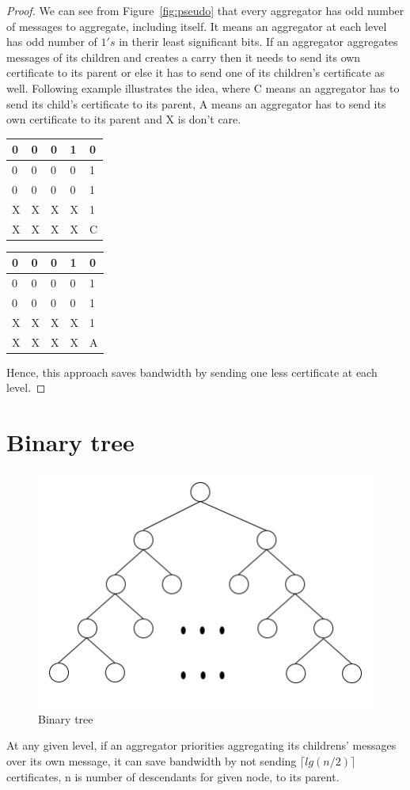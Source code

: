 	\begin{proof}
		We can see from Figure~\ref{fig:pseudo} that every aggregator has odd number of messages to aggregate, including itself.
		It means an aggregator at each level has odd number of $1's$ in therir least significant bits. 
		If an aggregator aggregates messages of its children and creates a carry then it needs to send its own certificate to its parent or else it has to send one of its children's certificate as well.
		Following example illustrates the idea, where C means an aggregator has to send its child's certificate to its parent, A means an aggregator has to send its own certificate to its parent and X is don't care.
		\begin{multicols}{2}
			\begin{tabular}{ l | l l l l }
				0 & 0 & 0 & 1 & 0 \\
				\hline
				0 & 0 & 0 & 0 & 1 \\
				0 & 0 & 0 & 0 & 1 \\
				X & X & X & X & 1 \\
				\hline
				X & X & X & X & C \\
			\end{tabular}
			\columnbreak{|}
			\begin{tabular}{ l | l l l l }
				0 & 0 & 0 & 1 & 0 \\
				\hline
				0 & 0 & 0 & 0 & 1 \\
				0 & 0 & 0 & 0 & 1 \\
				X & X & X & X & 1 \\
				\hline
				X & X & X & X & A \\
			\end{tabular}
		\end{multicols}
		
		Hence, this approach saves bandwidth by sending one less certificate at each level. 
	
	\end{proof}

\section{Binary tree}
	\begin{figure}[hp]
		\centering
		\includegraphics[scale = 0.3]{images/binary-tree}
		\caption{Binary tree}
		\label{fig:binary}
	\end{figure}

	\begin{theorem}
		At any given level, if an aggregator priorities aggregating its childrens' messages over its own message, it can save bandwidth by not sending $\lceil lg(n /2) \rceil$ certificates, n is number of descendants for given node, to its parent.
	\end{theorem}

